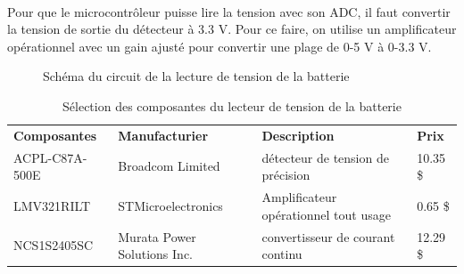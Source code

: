 	\paragraph*{}	
	Pour que le microcontrôleur puisse lire la tension avec son ADC, il faut convertir la tension de sortie du détecteur à 3.3 V. Pour ce faire, on utilise un amplificateur opérationnel avec un gain ajusté pour convertir une plage de 0-5 V à 0-3.3 V.
	
	\begin{figure}
		\centering
		\caption{Schéma du circuit de la lecture de tension de la batterie}
		\label{fig:schemalecturetension}
	\end{figure}
	
	\begin{table}[H]
		\centering
		\caption{Sélection des composantes du lecteur de tension de la batterie}
		\label{SelectionSenseVoltageBat}
		\renewcommand{\arraystretch}{1.3}
		\begin{tabular}{|p{3cm}|p{3.5cm}|p{6cm}|p{1.5cm}|}
			\hline
			\textbf{Composantes} & \textbf{Manufacturier} & \textbf{Description} & \textbf{Prix}
			\\ \hhline{|=|=|=|=|}
			ACPL-C87A-500E & Broadcom Limited & détecteur de tension de précision & 10.35 \$	\\ \hline
			LMV321RILT & STMicroelectronics & Amplificateur opérationnel tout usage & 0.65 \$	\\ \hline
			NCS1S2405SC & Murata Power Solutions Inc. & convertisseur de courant continu & 12.29 \$	\\ \hline
		\end{tabular}
	\end{table} 
